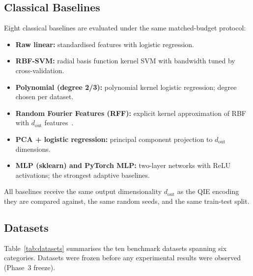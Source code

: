 \documentclass[12pt]{article}
\newcommand{\dout}{d_{\mathrm{out}}}
\begin{document}
\subsection{Classical Baselines}
\label{sec:baselines}

Eight classical baselines are evaluated under the same matched-budget protocol:

\begin{itemize}
  \item \textbf{Raw linear:} standardised features with logistic regression.
  \item \textbf{RBF-SVM:} radial basis function kernel SVM with bandwidth
        tuned by cross-validation.
  \item \textbf{Polynomial (degree 2/3):} polynomial kernel logistic
        regression; degree chosen per dataset.
  \item \textbf{Random Fourier Features (RFF):} explicit kernel approximation
        of RBF with $\dout$ features~\citep{rahimi2007}.
  \item \textbf{PCA + logistic regression:} principal component projection
        to $\dout$ dimensions.
  \item \textbf{MLP (sklearn) and PyTorch MLP:} two-layer networks
        with ReLU activations; the strongest adaptive baselines.
\end{itemize}

All baselines receive the same output dimensionality $\dout$ as the QIE
encoding they are compared against, the same random seeds, and the same
train-test split.

\subsection{Datasets}
\label{sec:datasets}

Table~\ref{tab:datasets} summarises the ten benchmark datasets spanning six
categories.
Datasets were frozen before any experimental results were observed
(Phase~3 freeze).
\end{document}
